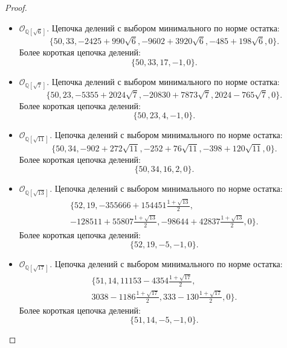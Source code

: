 \documentclass[_00_dissertation.tex]{subfiles}
\begin{document}
\begin{proof}
\begin{itemize}
        \item $\mathcal{O}_{\mathbb{Q}[\sqrt{6}]}$.
        Цепочка делений с выбором минимального по норме остатка:
        \begin{equation*}
            \{50, 33, -2425+990\sqrt{6}, -9602+3920\sqrt{6}, -485+198\sqrt{6}, 0\}.
        \end{equation*}
        Более короткая цепочка делений:
        \begin{equation*}
            \{50, 33, 17, -1, 0\}.
        \end{equation*}
    
        \item $\mathcal{O}_{\mathbb{Q}[\sqrt{7}]}$.
        Цепочка делений с выбором минимального по норме остатка:
        \begin{equation*}
            \{50, 23, -5355+2024\sqrt{7}, -20830+7873\sqrt{7}, 2024-765\sqrt{7}, 0\}.
        \end{equation*}
        Более короткая цепочка делений:
        \begin{equation*}
            \{50, 23, 4, -1, 0\}.
        \end{equation*}
    
        \item $\mathcal{O}_{\mathbb{Q}[\sqrt{11}]}$.
        Цепочка делений с выбором минимального по норме остатка:
        \begin{equation*}
            \{50, 34, -902+272\sqrt{11}, -252+76\sqrt{11}, -398+120\sqrt{11}, 0\}.
        \end{equation*}
        Более короткая цепочка делений:
        \begin{equation*}
            \{50, 34, 16, 2, 0\}.
        \end{equation*}
    
        \item $\mathcal{O}_{\mathbb{Q}[\sqrt{13}]}$.
        Цепочка делений с выбором минимального по норме остатка:
        \begin{multline*}
            \{52, 19, -355666+154451\frac{1+\sqrt{13}}{2},\\
            -128511+55807\frac{1+\sqrt{13}}{2}, -98644+42837\frac{1+\sqrt{13}}{2}, 0\}.
        \end{multline*}
        Более короткая цепочка делений:
        \begin{equation*}
            \{52, 19, -5, -1, 0\}.
        \end{equation*}
    
        \item $\mathcal{O}_{\mathbb{Q}[\sqrt{17}]}$.
        Цепочка делений с выбором минимального по норме остатка:
        \begin{multline*}
            \{51, 14, 11153-4354\frac{1+\sqrt{17}}{2},\\
            3038-1186\frac{1+\sqrt{17}}{2}, 333-130\frac{1+\sqrt{17}}{2}, 0\}.
        \end{multline*}
        Более короткая цепочка делений:
        \begin{equation*}
            \{51, 14, -5, -1, 0\}.
        \end{equation*}
    

\end{itemize}
\end{proof}
\end{document}
